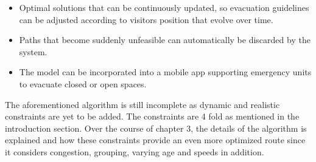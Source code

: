 \begin{itemize}
  \item Optimal solutions that can be continuously updated, so evacuation guidelines can be adjusted according to visitors position that evolve over time.
  \item Paths that become suddenly unfeasible can automatically be discarded by the system.
  \item The model can be incorporated into a mobile app supporting emergency units to evacuate closed or open spaces.
\end{itemize} 

The aforementioned algorithm is still incomplete as dynamic and realistic constraints are yet to be added. The constraints are 4 fold as mentioned in the introduction section. Over the course of chapter 3, the details of the algorithm is explained and how these constraints provide an even more optimized route since it considers congestion, grouping, varying age and speeds in addition. 




